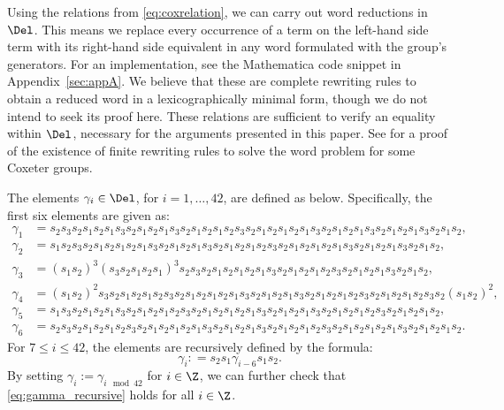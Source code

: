 Using the relations from \eqref{eq:coxrelation}, we can carry out word reductions in $\Del$.
This means we replace every occurrence of a term on the left-hand side term with its right-hand side equivalent in any word formulated with the group's generators.
For an implementation, see the Mathematica code snippet in Appendix~\ref{sec:appA}.
We believe that these are complete rewriting rules to obtain a reduced word in a lexicographically minimal form, though we do not intend to seek its proof here.
These relations are sufficient to verify an equality within $\Del$, necessary for the arguments presented in this paper.
See \cite{MR1261121} for a proof of the existence of finite rewriting rules to solve the word problem for some Coxeter groups.

The elements $\gamma_{i}\in \Del$, for $i=1,\dots,42$, are defined as below.
Specifically, the first six elements are given as:
\begin{align*}
\gamma_1& =s_2s_3s_2s_1s_2s_1s_3s_2s_1s_2s_1s_3s_2s_1s_2s_1s_2s_3s_2s_1s_2s_1s_2s_1s_3s_2s_1s_2s_1s_3s_2s_1s_2s_1s_3s_2s_1s_2,\\
\gamma_2& =s_1s_2s_3s_2s_1s_2s_1s_2s_1s_3s_2s_1s_2s_1s_3s_2s_1s_2s_1s_2s_3s_2s_1s_2s_1s_2s_1s_3s_2s_1s_2s_1s_3s_2s_1s_2,\\
\gamma_3& =(s_1s_2)^3(s_3s_2s_1s_2s_1)^3s_2s_3s_2s_1s_2s_1s_2s_1s_3s_2s_1s_2s_1s_2s_3s_2s_1s_2s_1s_3s_2s_1s_2,\\
\gamma_4& =(s_1s_2)^2s_3s_2s_1s_2s_1s_2s_3s_2s_1s_2s_1s_2s_1s_3s_2s_1s_2s_1s_3s_2s_1s_2s_1s_2s_3s_2s_1s_2s_1s_2s_3s_2(s_1s_2)^2,\\
\gamma_5& =s_1s_3s_2s_1s_2s_1s_3s_2s_1s_2s_1s_2s_3s_2s_1s_2s_1s_2s_1s_3s_2s_1s_2s_1s_3s_2s_1s_2s_1s_2s_3s_2s_1s_2s_1s_2,\\
\gamma_6& =s_2s_3s_2s_1s_2s_1s_2s_3s_2s_1s_2s_1s_2s_1s_3s_2s_1s_2s_1s_3s_2s_1s_2s_1s_2s_3s_2s_1s_2s_1s_2s_1s_3s_2s_1s_2s_1s_2.
\end{align*}
For $7\leq i\leq 42$, the elements are recursively defined by the formula:
\begin{equation}
\gamma_{i} : = s_2s_1 \gamma_{i-6} s_1s_2.
\label{eq:gamma_recursive}
\end{equation}
By setting $\gamma_{i} := \gamma_{i \mod {42}}$ for $i\in \Z$, 
we can further check that \eqref{eq:gamma_recursive} holds for all $i\in \Z$.

